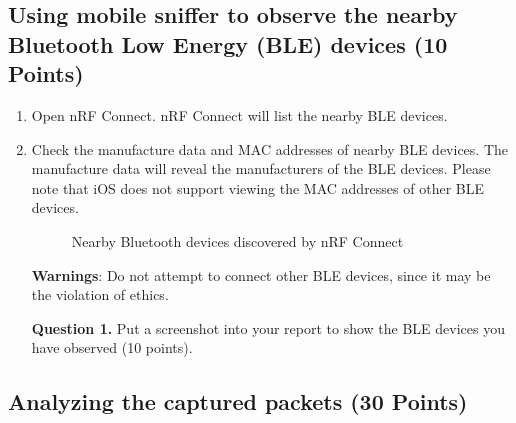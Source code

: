 \documentclass[11pt]{article}
\begin{document}
\subsection{Using mobile sniffer to observe the nearby Bluetooth Low Energy (BLE) devices (10 Points)} 
\begin{enumerate}
\item Open \textsf{nRF Connect}. \textsf{nRF Connect} will list the nearby BLE devices. 
\item Check the manufacture data and MAC addresses of nearby BLE devices. The manufacture data will reveal the manufacturers of the BLE devices. Please note that iOS does not support viewing the MAC addresses of other BLE devices. 

 \begin{figure}[h]
\centering
{}
\caption{\textsf{Nearby Bluetooth devices discovered by \textsf{nRF Connect}}}\label{fig:nearbydevice}
\end{figure}
\textbf{Warnings}: Do not attempt to connect other BLE devices, since it may be the violation of ethics.

\textbf{Question 1.} Put a screenshot into your report to show the BLE devices you have observed (10 points). 

\end{enumerate}

\subsection{Analyzing the captured packets (30 Points)}
\end{document}
